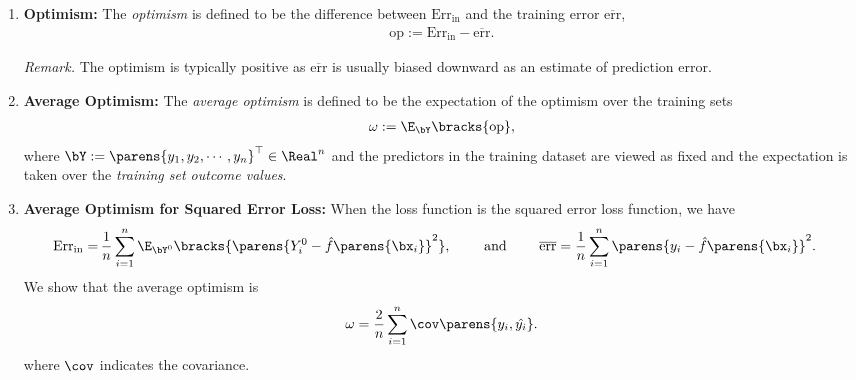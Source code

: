 \documentclass[12pt]{article}
\begin{document}
\begin{enumerate}[label=\textbf{\arabic*.}]
	\item \textbf{Optimism:} The \textit{optimism} is defined to be the difference between $\mathrm{Err}_{\mathrm{in}}$ and the training error $\overline{\mathrm{err}}$, 
	\begin{align*}
		\mathrm{op} := \mathrm{Err}_{\mathrm{in}} - \overline{\mathrm{err}}. 
	\end{align*}
	
	\textit{Remark.} The optimism is typically positive as $\overline{\mathrm{err}}$ is usually biased downward as an estimate of prediction error. 
	
	\item \textbf{Average Optimism:} The \textit{average optimism} is defined to be the expectation of the optimism over the training sets 
	\begin{align}
		\omega := \E_{\bY} \bracks{\mathrm{op}}, 
	\end{align}
	where $\bY := \parens{y_1, y_2, \cdots, y_n}^\top \in \Real^n$ and the predictors in the training dataset are viewed as fixed and the expectation is taken over the \emph{training set outcome values}. 
	
	\item \textbf{Average Optimism for Squared Error Loss:} When the loss function is the squared error loss function, we have 
	\begin{align*}
		\mathrm{Err}_{\mathrm{in}} = & \, \frac{1}{n} \sum_{i=1}^n \E_{\bY^0} \bracks{\parens{Y_i^0 - \hat{f} \parens{\bx_i}}^2}, \qquad \text{ and } \qquad 
		\overline{\mathrm{err}} = \frac{1}{n} \sum_{i=1}^n \parens{y_i - \hat{f} \parens{\bx_i}}^2. 
	\end{align*}
	We show that the average optimism is 
	\begin{align}\label{eq-ave-op}
		\omega = \frac{2}{n} \sum_{i=1}^n \cov \parens{y_i, \hat{y_i}}. 
	\end{align}
	where $\cov$ indicates the covariance. 
	

\end{enumerate}
\end{document}
